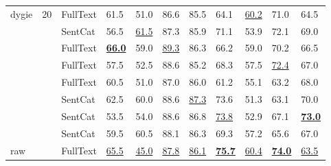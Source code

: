 \begin{tabular}{lllllllllll}
dygie & 20 & FullText &                       61.5 &                       51.0 &                       86.6 &                       85.5 &                       64.1 &           \underline{60.2} &                       71.0 &                       64.5 \\
    &    & SentCat &                       56.5 &           \underline{61.5} &                       87.3 &                       85.9 &                       71.1 &                       53.9 &                       72.1 &                       69.0 \\
    &    & FullText &  \underline{\textbf{66.0}} &                       59.0 &           \underline{89.3} &                       86.3 &                       66.2 &                       59.0 &                       70.2 &                       66.5 \\
    &    & FullText &                       57.5 &                       52.5 &                       88.6 &                       85.2 &                       68.3 &                       57.5 &           \underline{72.4} &                       67.0 \\
    &    & FullText &                       60.5 &                       51.0 &                       87.0 &                       86.0 &                       61.2 &                       55.1 &                       63.2 &                       68.0 \\
    &    & SentCat &                       62.5 &                       60.0 &                       88.6 &           \underline{87.3} &                       73.6 &                       51.3 &                       63.1 &                       70.0 \\
    &    & SentCat &                       53.5 &                       54.0 &                       88.6 &                       86.8 &           \underline{73.8} &                       52.9 &                       67.1 &  \underline{\textbf{73.0}} \\
    &    & SentCat &                       59.5 &                       60.5 &                       88.1 &                       86.3 &                       69.3 &                       57.2 &                       65.6 &                       67.0 \\
raw &    & FullText &           \underline{65.5} &           \underline{45.0} &           \underline{87.8} &           \underline{86.1} &  \underline{\textbf{75.7}} &           \underline{60.4} &  \underline{\textbf{74.0}} &           \underline{63.5} \\
\bottomrule
\end{tabular}
